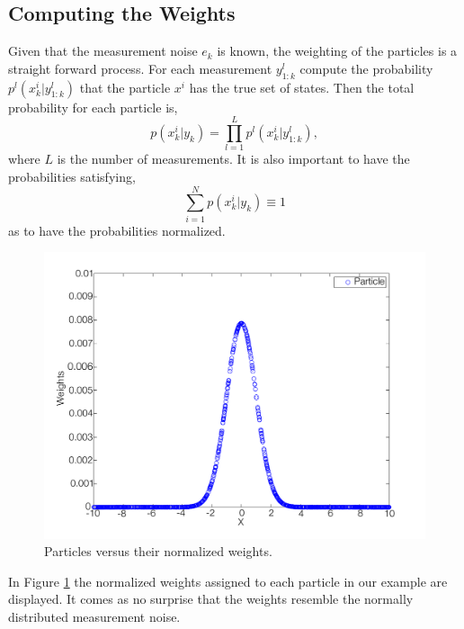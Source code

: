 \documentclass{LTHthesis}
\begin{document}
\subsection{Computing the Weights}
%
Given that the measurement noise $e_k$ is known, the weighting of the particles is a straight forward process. For each measurement $y^l_{1:k}$ compute the probability $p^l(x^i_k|y^l_{1:k})$ that the particle $x^i$ has the true set of states. Then the total probability for each particle is,
%
\begin{equation}
p(x^i_k|y_k)=\prod_{l=1}^{L}p^l(x^i_k|y^l_{1:k}), 
\end{equation}
%
where $L$ is the number of measurements. It is also important to have the probabilities satisfying,
%
\begin{equation}
\sum^{N}_{i=1}p(x^i_k|y_k)\equiv 1
\end{equation}
%
as to have the probabilities normalized.
%
\begin{figure}[!hbt]

\includegraphics[width=1\textwidth ]{images/PF/particle_weights}
\caption{Particles versus their normalized weights.}\label{particle_weights}
\end{figure}

In Figure \ref{particle_weights} the normalized weights assigned to each particle in our example are displayed. It comes as no surprise that the weights resemble the normally distributed measurement noise. 
%
\end{document}
